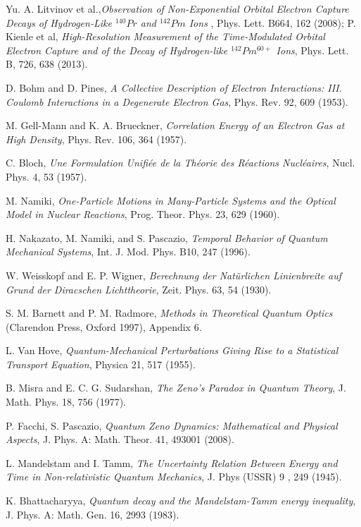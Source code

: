 \documentclass[12pt]{article}
\numberwithin{equation}{section}
\begin{document}
\begin{thebibliography}{}
 Yu. A. Litvinov et al.,{\em Observation of Non-Exponential Orbital Electron Capture Decays of Hydrogen-Like $^{140}Pr$ and $^{142}Pm$ Ions }, Phys. Lett. B664, 162 (2008); P. Kienle et al, {\em High-Resolution Measurement of the Time-Modulated Orbital Electron Capture and of the
Decay of Hydrogen-like $^{142}Pm^{60+}$ Ions}, Phys. Lett. B, 726, 638 (2013).


 D. Bohm and D. Pines, {\em A Collective Description of Electron Interactions: III. Coulomb Interactions in a Degenerate Electron Gas}, Phys. Rev. 92, 609 (1953).

  M. Gell-Mann and K. A. Brueckner, {\em Correlation Energy of an Electron Gas at High Density}, Phys. Rev. 106, 364 (1957).

      C. Bloch, {\em Une Formulation Unifiée de la Théorie des Réactions Nucléaires}, Nucl. Phys. 4, 53 (1957).

      M. Namiki, {\em One-Particle Motions in Many-Particle Systems and the Optical Model in Nuclear Reactions}, Prog. Theor. Phys. 23, 629 (1960).

 H.  Nakazato, M. Namiki, and S. Pascazio, {\em Temporal Behavior of Quantum Mechanical Systems}, Int. J. Mod. Phys. B10, 247 (1996).

 W. Weisskopf and E. P. Wigner, {\em Berechnung der Natürlichen Linienbreite auf Grund der Diracschen Lichttheorie}, Zeit. Phys. 63, 54 (1930).

 S. M. Barnett and P. M. Radmore, {\em Methods in Theoretical
Quantum Optics} (Clarendon Press, Oxford 1997), Appendix 6.

 L. Van Hove, {\em Quantum-Mechanical Perturbations Giving Rise to a Statistical Transport Equation}, Physica 21, 517
(1955).

 B. Misra and E. C. G. Sudarshan, {\em The Zeno’s Paradox in Quantum Theory}, J. Math. Phys.  18, 756 (1977).

 P. Facchi, S. Pascazio, {\em Quantum Zeno Dynamics: Mathematical and Physical
Aspects}, J. Phys. A: Math. Theor. 41, 493001 (2008).

 L. Mandelstam and I. Tamm, {\em The Uncertainty Relation Between Energy and Time in Non-relativistic Quantum Mechanics},  J. Phys (USSR) 9 , 249 (1945).

 K. Bhattacharyya, {\em Quantum decay and the Mandelstam-Tamm energy
inequality}, J. Phys. A: Math. Gen. 16, 2993 (1983).


\end{thebibliography}
\end{document}
